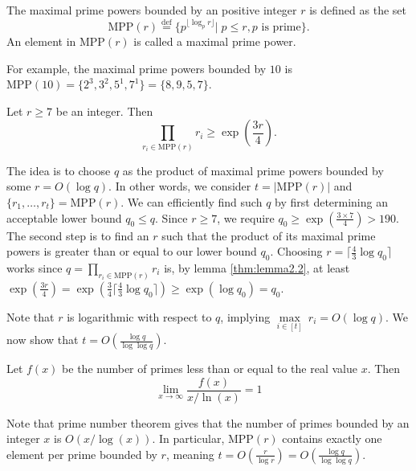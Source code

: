 \begin{definition}
    The maximal prime powers bounded by an positive integer $r$ is defined as the set
    \begin{equation*}
        \text{MPP}(r) \stackrel{\mathrm{def}}{=} \{p^{\lfloor \log_p r \rfloor} | \; p \leq r, p \text{ is prime}\}.
    \end{equation*}
    An element in $\text{MPP}(r)$ is called a maximal prime power.
\end{definition}
For example, the maximal prime powers bounded by $10$ is $\text{MPP}(10) = \{2^3, 3^2, 5^1, 7^1\} = \{8,9,5,7\}$.

\begin{lemma}\label{thm:lemma2.2}
    Let $r \geq 7$ be an integer. Then
    \begin{equation*}
        \underset{r_i \in \text{MPP}(r)}{\prod} r_i \geq \exp \left(\frac{3r}{4}\right).
    \end{equation*}
\end{lemma}

The idea is to choose $q$ as the product of maximal prime powers bounded by some $r = O(\log q)$. In other words, we consider $t = |\text{MPP}(r)|$ and $\{r_1, \dots, r_t\} = \text{MPP}(r)$. We can efficiently find such $q$ by first determining an acceptable lower bound $q_0 \leq q$. Since $r \geq 7$, we require $q_0 \geq \exp(\frac{3 \times 7}{4}) > 190$. The second step is to find an $r$ such that the product of its maximal prime powers is greater than or equal to our lower bound $q_0$. Choosing $r = \lceil \frac{4}{3} \log q_0 \rceil$ works since $q = \underset{r_i \in \text{MPP}(r)}{\prod} r_i$ is, by lemma \ref{thm:lemma2.2}, at least $\exp \left(\frac{3r}{4}\right) = \exp \left( \frac{3}{4} \lceil \frac{4}{3} \log q_0 \rceil \right) \geq \exp \left( \log q_0 \right) = q_0$.

Note that $r$ is logarithmic with respect to $q$, implying $\underset{i \in [t]}{\max} \ r_i = O(\log q)$.
We now show that $t = O(\frac{\log q}{\log \log q})$.

\begin{lemma}\label{lemma:prime_number_theorem}
    Let $f(x)$ be the number of primes less than or equal to the real value $x$. Then
    \begin{equation*}
        \lim_{x \to \infty} \frac{f(x)}{x/\ln(x)} = 1
    \end{equation*}
\end{lemma}
Note that prime number theorem gives that the number of primes bounded by an integer $x$ is $O(x/\log(x))$. In particular, $\text{MPP}(r)$ contains exactly one element per prime bounded by $r$, meaning $t = O(\frac{r}{\log r}) = O(\frac{\log q}{\log \log q})$.

